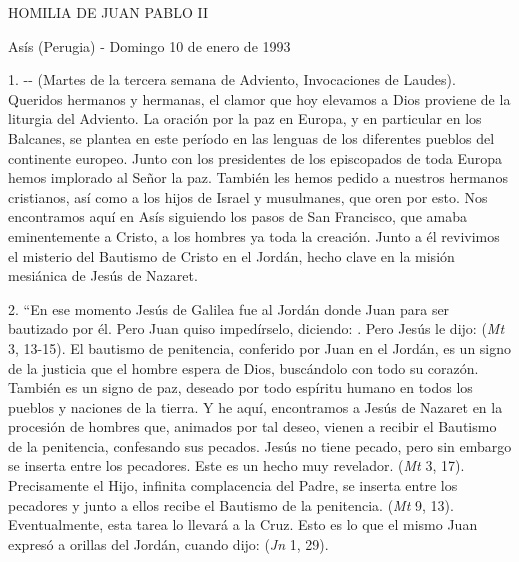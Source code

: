 \begin{body}
	HOMILIA DE JUAN PABLO II
	
	Asís (Perugia) - Domingo 10 de enero de 1993
	
	1.  -\/-  (Martes de la tercera semana de Adviento, Invocaciones de Laudes). Queridos hermanos y hermanas, el clamor que hoy elevamos a Dios proviene de la liturgia del Adviento. La oración por la paz en Europa, y en particular en los Balcanes, se plantea en este período en las lenguas de los diferentes pueblos del continente europeo. Junto con los presidentes de los episcopados de toda Europa hemos implorado al Señor la paz. También les hemos pedido a nuestros hermanos cristianos, así como a los hijos de Israel y musulmanes, que oren por esto. Nos encontramos aquí en Asís siguiendo los pasos de San Francisco, que amaba eminentemente a Cristo, a los hombres ya toda la creación. Junto a él revivimos el misterio del Bautismo de Cristo en el Jordán, hecho clave en la misión mesiánica de Jesús de Nazaret.
	
	2. ``En ese momento Jesús de Galilea fue al Jordán donde Juan para ser bautizado por él. Pero Juan quiso impedírselo, diciendo: . Pero Jesús le dijo:  (\emph{Mt} 3, 13-15). El bautismo de penitencia, conferido por Juan en el Jordán, es un signo de la justicia que el hombre espera de Dios, buscándolo con todo su corazón. También es un signo de paz, deseado por todo espíritu humano en todos los pueblos y naciones de la tierra. Y he aquí, encontramos a Jesús de Nazaret en la procesión de hombres que, animados por tal deseo, vienen a recibir el Bautismo de la penitencia, confesando sus pecados. Jesús no tiene pecado, pero sin embargo se inserta entre los pecadores. Este es un hecho muy revelador.  (\emph{Mt} 3, 17). Precisamente el Hijo, infinita complacencia del Padre, se inserta entre los pecadores y junto a ellos recibe el Bautismo de la penitencia.  (\emph{Mt} 9, 13). Eventualmente, esta tarea lo llevará a la Cruz. Esto es lo que el mismo Juan expresó a orillas del Jordán, cuando dijo:  (\emph{Jn} 1, 29).
	

\end{body}
